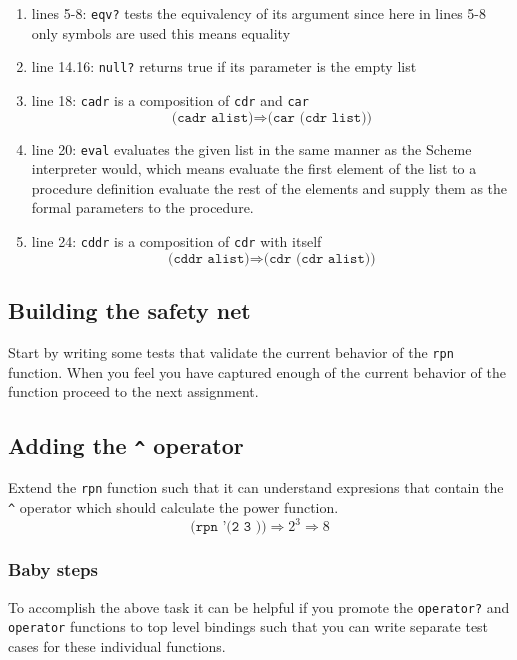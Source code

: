 \documentclass[12pt,a4paper,english,twoside]{article}
\begin{document}
\begin{enumerate}
  \item lines 5-8: \texttt{eqv?} tests the equivalency of its argument since here in lines 
    5-8 only symbols are used this means equality
  \item line 14.16: \texttt{null?} returns true if its parameter is the empty list
  \item line 18: \texttt{cadr} is a composition of \texttt{cdr} and \texttt{car} 
    \begin{equation*}
      \texttt{(cadr alist)} \Rightarrow \texttt{(car (cdr list))}
    \end{equation*}
  \item line 20: \texttt{eval} evaluates the given list in the same manner as the 
    Scheme interpreter would, which means evaluate the first element of the 
    list to a procedure definition evaluate the rest of the elements and 
    supply them as the formal parameters to the procedure.
  \item line 24: \texttt{cddr} is a composition of \texttt{cdr} with itself
    \begin{equation*}
      \texttt{(cddr alist)} \Rightarrow \texttt{(cdr (cdr alist))}
    \end{equation*}
\end{enumerate}
\subsection{Building the safety net}
Start by writing some tests that validate the current behavior of the 
\texttt{rpn} function. When you feel you have captured enough of the current 
behavior of the function proceed to the next assignment.
\subsection{Adding the \texttt{\^{}} operator}
Extend the \texttt{rpn} function such that it can understand expresions that 
contain the \texttt{\^{}} operator which should calculate the power function.  
\begin{equation*}
\texttt{(rpn '(2 3 \^{}))} \Rightarrow 2^{3} \Rightarrow 8 
\end{equation*}

\subsubsection{Baby steps}
To accomplish the above task it can be helpful if you promote the 
\texttt{operator?} and \texttt{operator} functions to top level bindings such 
that you can write separate test cases for these individual functions.
\end{document}
